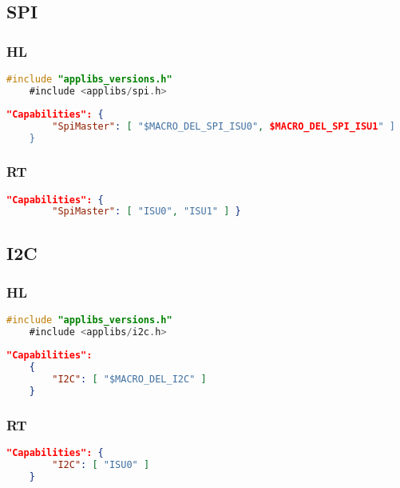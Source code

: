 \subsection{SPI}
\subsubsection{HL}
\begin{lstlisting}[language = C, firstnumber=0]
	#include "applibs_versions.h"
	#include <applibs/spi.h>
\end{lstlisting}
\begin{lstlisting}[language = json, firstnumber=0]	
	"Capabilities": {  
		"SpiMaster": [ "$MACRO_DEL_SPI_ISU0", $MACRO_DEL_SPI_ISU1" ]
	}
\end{lstlisting}
\subsubsection{RT}
\begin{lstlisting}[language = json, firstnumber=0]	
	"Capabilities": {
		"SpiMaster": [ "ISU0", "ISU1" ] }
\end{lstlisting}

\subsection{I2C}
\subsubsection{HL}
\begin{lstlisting}[language = C, firstnumber=0]
	#include "applibs_versions.h"
	#include <applibs/i2c.h>
\end{lstlisting}
\begin{lstlisting}[language = json, firstnumber=0]		"Capabilities":
	{  
		"I2C": [ "$MACRO_DEL_I2C" ] 
	}
\end{lstlisting}
\subsubsection{RT}
\begin{lstlisting}[language = json, firstnumber=0]	
	"Capabilities": {
		"I2C": [ "ISU0" ]
	}
\end{lstlisting}
